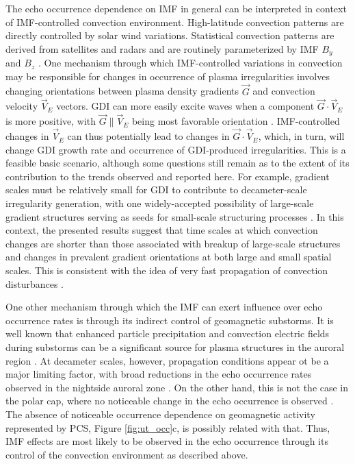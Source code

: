 The echo occurrence dependence on IMF in general can be interpreted in context of IMF-controlled convection environment. High-latitude convection patterns are directly controlled by solar wind variations. Statistical convection patterns are derived from satellites and radars and are routinely parameterized by IMF \(B_y\) and \(B_z\) \citep{Haaland2007, Pettigrew2010}. One mechanism through which IMF-controlled variations in convection may be responsible for changes in occurrence of plasma irregularities involves changing orientations between plasma density gradients \(\vec{G}\) and convection velocity \(\vec{V}_E\) vectors. GDI can more easily excite waves when a component \(\vec{G}\cdot\vec{V}_E\) is more positive, with \(\vec{G}\parallel\vec{V}_E\) being most favorable orientation \citep{Keskinen1982,Makarevich2014c}. IMF-controlled changes in \(\vec{V}_E\) can thus potentially lead to changes in \(\vec{G}\cdot\vec{V}_E\), which, in turn, will change GDI growth rate and occurrence of GDI-produced irregularities. This is a feasible basic scenario, although some questions still remain as to the extent of its contribution to the trends observed and reported here. For example, gradient scales must be relatively small for GDI to contribute to decameter-scale irregularity generation, with one widely-accepted possibility of large-scale gradient structures serving as seeds for small-scale structuring processes \citep{Tsunoda1988}. In this context, the presented results suggest that time scales at which convection changes are shorter than those associated with breakup of large-scale structures and changes in prevalent gradient orientations at both large and small spatial scales. This is consistent with the idea of very fast propagation of convection disturbances \citep{Ridley1998,Ruohoniemi2002,Fiori2012,Taguchi2015}.

One other mechanism through which the IMF can exert influence over echo occurrence rates is through its indirect control of geomagnetic substorms.  It is well known that enhanced particle precipitation and convection electric fields during substorms can be a significant source for plasma structures in the auroral region \citep[e.g.][]{Tsunoda1988}.  At decameter scales, however, propagation conditions appear ot be a major limiting factor, with broad reductions in the echo occurrence rates observed in the nightside auroral zone \citep{Wild2008}.  On the other hand, this is not the case in the polar cap, where no noticeable change in the echo occurrence is observed \citep[Figures 1 and 2]{Wild2008}.  The absence of noticeable occurrence dependence on geomagnetic activity represented by PCS, Figure \ref{fig:ut_occ}c, is possibly related with that.  Thus, IMF effects are most likely to be observed in the echo occurrence through its control of the convection environment as described above.



